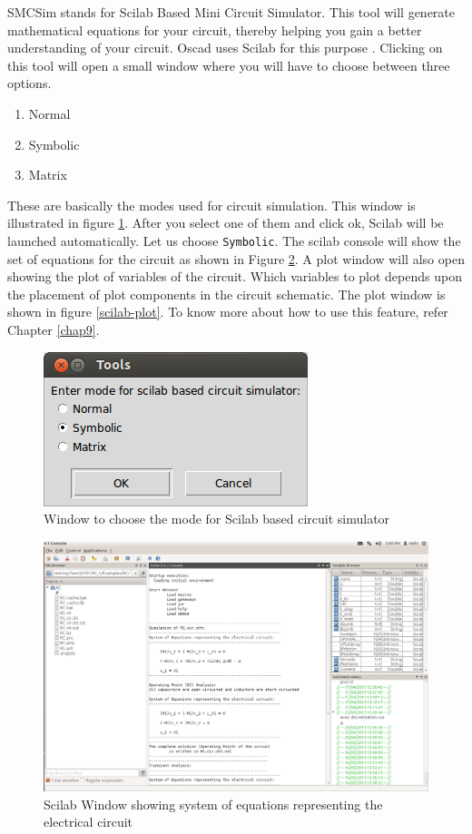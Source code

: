 SMCSim stands for Scilab Based Mini Circuit Simulator. This tool will generate mathematical equations for your circuit, thereby helping you gain a better understanding of your circuit. Oscad uses Scilab for this purpose \cite{scilab}. Clicking on this tool will open a small window where you will have to choose between three options.
\begin{enumerate}
\item Normal
\item Symbolic
\item Matrix
\end{enumerate}
These are basically the modes used for circuit simulation. This window is illustrated in figure \ref{scilab-mode}. After you select one of them and click ok, Scilab will be launched automatically. Let us choose {\tt Symbolic}.  The scilab console will show the set of equations for the circuit as shown in Figure \ref{scilab-window}. A plot window will also open showing the plot of variables of the circuit. Which variables to plot depends upon the placement of plot components in the circuit schematic. The plot window is shown in figure \ref{scilab-plot}. To know more about how to use this feature, refer Chapter \ref{chap9}.

\begin{figure}
\begin{center}
\includegraphics[width=0.5\linewidth]{figures/scilab-mode.png}
\caption{Window to choose the mode for Scilab based circuit simulator}
\label{scilab-mode}
\end{center}
\end{figure}

\begin{figure}
\begin{center}
\includegraphics[width=\linewidth]{figures/scilabRC.png}
\caption{Scilab Window showing system of equations representing the electrical circuit}
\label{scilab-window}
\end{center}
\end{figure}

